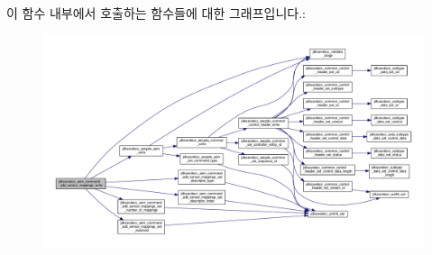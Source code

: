 이 함수 내부에서 호출하는 함수들에 대한 그래프입니다.\+:
\nopagebreak
\begin{figure}[H]
\begin{center}
\leavevmode
\includegraphics[width=350pt]{group__command__add__sensor__mappings_ga54f5af8188b8fbf9ab5b981efa7051db_cgraph}
\end{center}
\end{figure}


